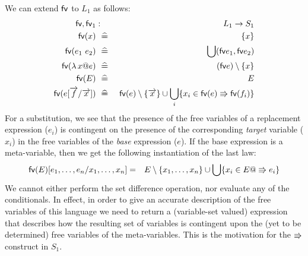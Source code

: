 We can extend $\mathsf{fv}$ to $L_1$ as follows:
\begin{eqnarray*}
   \fv,\fv_1 &:& L_1 \fun S_1
\\ \fv(x) &\defs& \setof x
\\ \fv(e_1~e_2) &\defs& \bigcup( \fv e_1,\fv e_2 )
\\ \fv(\lambda x @ e) &\defs& (\fv e) \setminus \setof x
\\ \fv(E) &\defs& E
\\ \fv (e[\vec f/\vec x])
   &\defs&
   \fv(e)\setminus\setof{\vec x}
   \cup
   \bigcup_i \setof{ x_i \in \fv(e) \sthen \fv(f_i)}
\end{eqnarray*}
For a substitution, we see that the presence of the free variables
of a replacement expression ($e_i$) is contingent
on the presence of the corresponding \emph{target} variable ($x_i$)
in the free variables of the \emph{base} expression ($e$).
If the base expression is a meta-variable, then we get the following
instantiation of the last law:
\begin{eqnarray*}
   \mathsf{fv}(E)[e_1,\ldots,e_n/x_1,\ldots,x_n]
   &=& E\setminus\{x_1,\ldots,x_n\}
       \cup
       \bigcup \{  x_i \in  E @ \Rrightarrow e_i \}
\end{eqnarray*}
We cannot either perform the set difference operation,
nor evaluate any of the conditionals.
In effect, in order to give an accurate description of the free variables
of this language we need to return a (variable-set valued) expression
that describes how the resulting set of variables is contingent
upon the (yet to be determined) free variables of the meta-variables.
This is the motivation for the $\Rrightarrow$ construct in $S_1$.



